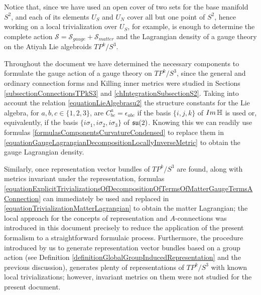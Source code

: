 Notice that, since we have used an open cover of two sets for the base manifold $S^2$, and each of its elements $U_S$ and $U_N$ cover all but one point of $S^2$, hence working on a local trivialization over $U_S$, for example, is enough to determine the complete action $\mathcal S = \mathcal S_{gauge} + \mathcal S_{matter}$ and the Lagrangian density of a gauge theory on the Atiyah Lie algebroids $TP^k/S^3$.

Throughout the document we have determined the necessary components to formulate the gauge action of a gauge theory on $TP^k/S^3$, since the general and ordinary connection forms and Killing inner metrics were studied in Sections \ref{subsectionConnectionsTPkS3} and \ref{chIntegrationSubsectionS2}. Taking into account the relation \eqref{equationLieAlgebrasu2} the structure constants for the Lie algebra, for $a, b, c \in \{1, 2, 3\}$, are $C^a_{bc} = \epsilon_{abc}$ if the basis $\{i, j, k\}$ of $Im \operatorname{\mathbb{H}}$ is used or, equivalently, if the basis $\{i\sigma_1, i\sigma_2, i\sigma_3\}$ of $\mathfrak{su}(2)$. Knowing this we can readily use formulas \eqref{formulasComponentsCurvatureCondensed}
to replace them in \eqref{equationGaugeLagrangianDecompositionLocallyInverseMetric} to obtain the gauge Lagrangian density. 

Similarly, once representation vector bundles of $TP^k/S^3$ are found, along with metrics invariant under the representation, formulas \eqref{equationExplicitTrivializationsOfDecompositionOfTermsOfMatterGaugeTermsAConnection} can immediately be used and replaced in \eqref{equationTrivializationMatterLagrangian} to obtain the matter Lagrangian; the local approach for the concepts of representation and $A$-connections was introduced in this document precisely to reduce the application of the present formalism to a straightforward formulaic process. Furthermore, the procedure introduced by us to generate representation vector bundles based on a group action (see Definition \ref{definitionGlobalGroupInducedRepresentation} and the previous discussion), generates plenty of representations of $TP^k/S^3$ with known local trivializations; however, invariant metrics on them were not studied for the present document.